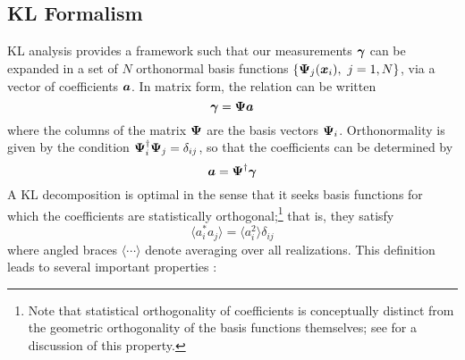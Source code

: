\subsection{KL Formalism}
\label{KL_Formalism}
KL analysis provides a framework such that our measurements $\boldsymbol{\gamma}$ 
can be expanded in a set of $N$ orthonormal basis functions 
$\left\{ \boldsymbol{\Psi}_j(\boldsymbol{x}_i),\ j=1,N\right\}$, via a vector of
coefficients $\boldsymbol{a}$.  In matrix form, the relation can be written
\begin{equation}
  \boldsymbol{\gamma} = \boldsymbol{\Psi}\boldsymbol{a}
\end{equation}
where the columns of the matrix $\boldsymbol{\Psi}$ are the basis vectors 
$\boldsymbol{\Psi}_i$.  Orthonormality is given by the condition 
$\boldsymbol{\Psi}_i^\dagger\boldsymbol{\Psi}_j = \delta_{ij}$, so that the coefficients
can be determined by
\begin{equation}
  \boldsymbol{a} = \boldsymbol{\Psi}^\dagger\boldsymbol{\gamma}
\end{equation}
A KL decomposition is optimal in the sense that it seeks basis 
functions for which the 
coefficients are statistically orthogonal;\footnote{Note that statistical
orthogonality of coefficients is conceptually distinct from the 
geometric orthogonality of the basis functions themselves; 
see \citet{Vogeley96} for a discussion of this property.}
that is, they satisfy
\begin{equation}
  \langle a_i^* a_j \rangle = \langle a_i^2 \rangle \delta_{ij}
\end{equation}
where angled braces $\langle\cdots\rangle$ denote averaging over all 
realizations.  This definition leads to several important properties
\citep[see][for a thorough discussion \& derivation]{Vogeley96}:
